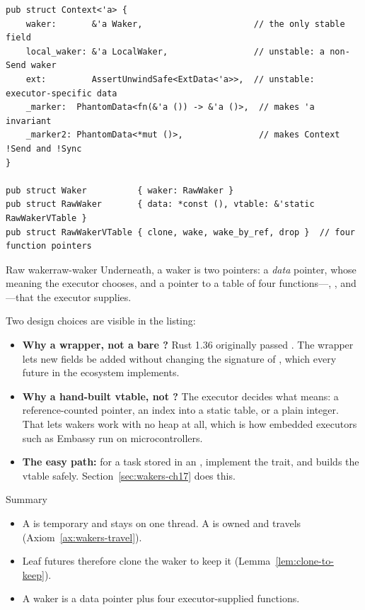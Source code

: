 \begin{lstlisting}[caption={\texttt{Context}, \texttt{Waker} and \texttt{RawWaker} as defined in Rust 1.97.}, label=lst:wakers-4.2]
pub struct Context<'a> {
    waker:       &'a Waker,                      // the only stable field
    local_waker: &'a LocalWaker,                 // unstable: a non-Send waker
    ext:         AssertUnwindSafe<ExtData<'a>>,  // unstable: executor-specific data
    _marker:  PhantomData<fn(&'a ()) -> &'a ()>,  // makes 'a invariant
    _marker2: PhantomData<*mut ()>,               // makes Context !Send and !Sync
}

pub struct Waker          { waker: RawWaker }
pub struct RawWaker       { data: *const (), vtable: &'static RawWakerVTable }
pub struct RawWakerVTable { clone, wake, wake_by_ref, drop }  // four function pointers
\end{lstlisting}

\begin{definition}{Raw waker}{raw-waker}
    Underneath, a waker is two pointers: a \emph{data} pointer, whose meaning the executor chooses, and a pointer to a table of four functions---, ,  and ---that the executor supplies.
\end{definition}

Two design choices are visible in the listing:

\begin{itemize}
    \item \textbf{Why a wrapper, not a bare ?} Rust 1.36 originally passed . The wrapper lets new fields be added without changing the signature of , which every future in the ecosystem implements.
    \item \textbf{Why a hand-built vtable, not ?} The executor decides what  means: a reference-counted pointer, an index into a static table, or a plain integer. That lets wakers work with no heap at all, which is how embedded executors such as Embassy run on microcontrollers.
    \item \textbf{The easy path:} for a task stored in an , implement the  trait, and  builds the vtable safely. Section~\ref{sec:wakers-ch17} does this.
\end{itemize}

\begin{quotebox}{Summary}
    \begin{itemize}
        \item A  is temporary and stays on one thread. A  is owned and travels (Axiom~\ref{ax:wakers-travel}).
        \item Leaf futures therefore clone the waker to keep it (Lemma~\ref{lem:clone-to-keep}).
        \item A waker is a data pointer plus four executor-supplied functions.
    \end{itemize}
\end{quotebox}

